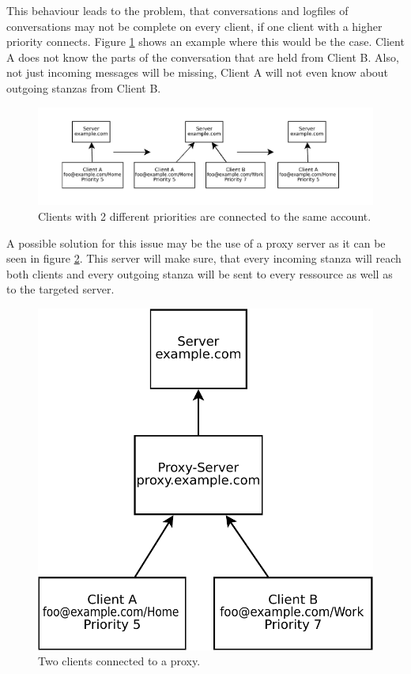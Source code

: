 \documentclass[a4paper,10pt,numbers=noendperiod]{scrartcl}
\begin{document}
This behaviour leads to the problem, that conversations and logfiles of conversations may not be complete on every client, if one client with a higher priority connects. Figure \ref{fig:2clients} shows an example where this would be the case. Client A does not know the parts of the conversation that are held from Client B. Also, not just incoming messages will be missing, Client A will not even know about outgoing stanzas from Client B. 
\begin{figure}[h!]
	\begin{center}
		\includegraphics[scale=0.6]{figures/diagram1.pdf}
	\end{center}
	\caption{Clients with 2 different priorities are connected to the same account.}
	\label{fig:2clients}
\end{figure}


A possible solution for this issue may be the use of a proxy server as it can be seen in figure \ref{fig:2clientsproxy}. This server will make sure, that every incoming stanza will reach both clients and every outgoing stanza will be sent to every ressource as well as to the targeted server.

\begin{figure}[h!]
	\begin{center}
		\includegraphics[scale=0.5]{figures/diagram3.pdf}
	\end{center}
	\caption{Two clients connected to a proxy.}
	\label{fig:2clientsproxy}
\end{figure}
\end{document}
